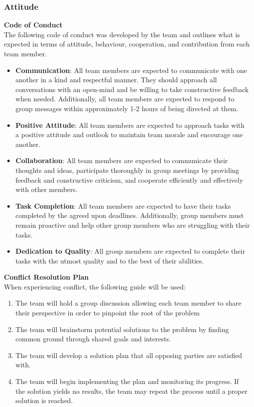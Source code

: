 \documentclass{article}
\begin{document}
\subsubsection*{Attitude} \label{sec:Attitude}
\textbf{Code of Conduct} \\ 
The following code of conduct was developed by the team and outlines what is expected in terms of attitude, behaviour, cooperation, and contribution from each team member.
\begin{itemize}
    \item \textbf{Communication}: All team members are expected to communicate with one another in a kind and respectful manner. They should approach all conversations with an open-mind and be willing to take constructive feedback when needed. Additionally, all team members are expected to respond to group messages within approximately 1-2 hours of being directed at them.
    \item \textbf{Positive Attitude}: All team members are expected to approach tasks with a positive attitude and outlook to maintain team morale and encourage one another.
    \item \textbf{Collaboration}: All team members are expected to communicate their thoughts and ideas, participate thoroughly in group meetings by providing feedback and constructive criticism, and cooperate efficiently and effectively with other members.
    \item \textbf{Task Completion}: All team members are expected to have their tasks completed by the agreed upon deadlines. Additionally, group members must remain proactive and help other group members who are struggling with their tasks.
    \item \textbf{Dedication to Quality}: All group members are expected to complete their tasks with the utmost quality and to the best of their abilities.
\end{itemize}
\textbf{Conflict Resolution Plan} \\ 
When experiencing conflict, the following guide will be used:
\begin{enumerate}
    \item The team will hold a group discussion allowing each team member to share their perspective in order to pinpoint the root of the problem
    \item The team will brainstorm potential solutions to the problem by finding common ground through shared goals and interests.
    \item The team will develop a solution plan that all opposing parties are satisfied with.
    \item The team will begin implementing the plan and monitoring its progress. If the solution yields no results, the team may repeat the process until a proper solution is reached.
\end{enumerate}
\end{document}
